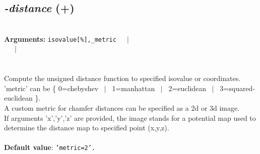 \documentclass[a4paper,11pt,twoside]{book}
\begin{document}
\subsection{\emph{-distance} (+)}\vspace*{-0.5em}
~\\\textbf{Arguments: } 
{\small \texttt{isovalue[\%],\_metric}}~~~$|$\\
~~~$|$\\
\\~\\
Compute the unsigned distance function to specified isovalue or coordinates.
~\\'metric' can be \{ 0=chebyshev ~$|$~ 1=manhattan ~$|$~ 2=euclidean ~$|$~ 3=squared-euclidean \}.
~\\A custom metric for chamfer distances can be specified as a 2d or 3d image.
~\\If arguments 'x','y','z' are provided, the image stands for a potential map used to
determine the distance map to specified point (x,y,z).
~\\~\\\textbf{Default value}: {\small \texttt{'metric=2'.}}
\end{document}
